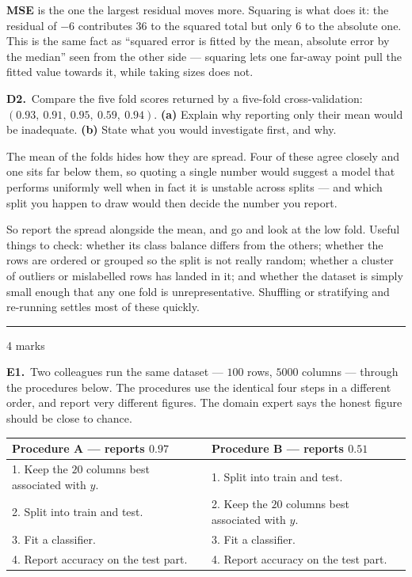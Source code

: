 \documentclass[10pt,a4paper]{article}
\newcommand{\parthead}[2]{\vspace{2pt}\noindent\rule{\linewidth}{0.4pt}\par\vspace{2pt}%
  \noindent{\bfseries Part #1}\hfill{\small #2}\par\vspace{1pt}}
\newcommand{\sol}[1]{\textbf{#1}}
\begin{document}
\sol{MSE} is the one the largest residual moves more. Squaring is what does it: the residual of $-6$ contributes $36$ to the squared total but only $6$ to the absolute one. This is the same fact as ``squared error is fitted by the mean, absolute error by the median'' seen from the other side --- squaring lets one far-away point pull the fitted value towards it, while taking sizes does not.

\vspace{6pt}

\textbf{D2.}\ Compare the five fold scores returned by a five-fold cross-validation: $(0.93,\ 0.91,\ 0.95,\ 0.59,\ 0.94)$. \textbf{(a)} Explain why reporting only their mean would be inadequate. \textbf{(b)} State what you would investigate first, and why.

\vspace{2pt}

The mean of the folds hides how they are spread. Four of these agree closely and one sits far below them, so quoting a single number would suggest a model that performs uniformly well when in fact it is unstable across splits --- and which split you happen to draw would then decide the number you report.\par\vspace{1mm}So report the spread alongside the mean, and go and look at the low fold. Useful things to check: whether its class balance differs from the others; whether the rows are ordered or grouped so the split is not really random; whether a cluster of outliers or mislabelled rows has landed in it; and whether the dataset is simply small enough that any one fold is unrepresentative. Shuffling or stratifying and re-running settles most of these quickly.

\newpage

\parthead{E --- Reasoning}{4 marks}

\textbf{E1.}\ Two colleagues run the same dataset --- $100$ rows, $5000$ columns --- through the procedures below.
The procedures use the identical four steps in a different order, and report very different figures. The
domain expert says the honest figure should be close to chance.

\vspace{2mm}
\begin{center}\small
\begin{tabular}{@{}l@{\qquad}l@{}}
\hline
\rule{0pt}{11pt}\textbf{Procedure A --- reports $0.97$} & \textbf{Procedure B --- reports $0.51$}\\[2pt]
\hline
\rule{0pt}{11pt}1. Keep the $20$ columns best associated with $y$. & 1. Split into train and test.\\
2. Split into train and test. & 2. Keep the $20$ columns best associated with $y$.\\
3. Fit a classifier. & 3. Fit a classifier.\\
4. Report accuracy on the test part. & 4. Report accuracy on the test part.\\[2pt]
\hline
\end{tabular}
\end{center}
\end{document}
